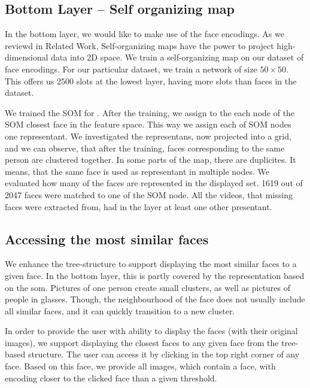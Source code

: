 \subsection{Bottom Layer -- Self organizing map}

In the bottom layer, we would like to make use of the face encodings. As we reviewd in Related Work, Self-organizing maps have the power to project high-dimensional data into 2D space. We train a self-organizing map on our dataset of face encodings. For our particular dataset, we train a network of size $50\times 50$. This offers us 2500 slots at the lowest layer, having more slots than faces in the dataset.

We trained the SOM for \todo{}. After the training, we assign to the each node of the SOM closest face in the feature space. This way we assign each of SOM nodes one representant. We investigated the representans, now projected into a grid, and we can observe, that after the training, faces corresponding to the same person are clustered together. In some parts of the map, there are duplicites. It means, that the same face is used as representant in multiple nodes. We evaluated how many of the faces are represented in the displayed set. 1619 out of 2047 faces were matched to one of the SOM node. All the videos, that missing faces were extracted from, had in the layer at least one other presentant.



\subsection{Accessing the most similar faces}

We enhance the tree-structure to support displaying the most similar faces to a given face. In the bottom layer, this is partly covered by the representation based on the \acrshort{som}. Pictures of one person create small clusters, as well as pictures of people in glasses. Though, the neighbourhood of the face does not usually include all similar faces, and it can quickly transition to a new cluster.

In order to provide the user with ability to display the faces (with their original images), we support displaying the closest faces to any given face from the tree-based structure. The user can access it by clicking in the top right corner of any face. Based on this face, we provide all images, which contain a face, with encoding closer to the clicked face than a given threshold.



